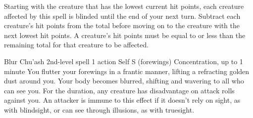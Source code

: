 Starting with the creature that has the lowest current hit points, each creature affected by this spell is blinded until the end of your next turn.
Subtract each creature's hit points from the total before moving on to the creature with the next lowest hit points.
A creature's hit points must be equal to or less than the remaining total for that creature to be affected.

\DndSpellHeader %
  {Blur \label{spell::blur}}
  {Chu'ash 2nd-level spell}
  {1 action}
  {Self}
  {S (forewings)}
  {Concentration, up to 1 minute}
You flutter your forewings in a frantic manner, lifting a refracting golden dust around you.
Your body becomes blurred, shifting and wavering to all who can see you.
For the duration, any creature has disadvantage on attack rolls against you.
An attacker is immune to this effect if it doesn't rely on sight, as with blindsight, or can see through illusions, as with truesight.


